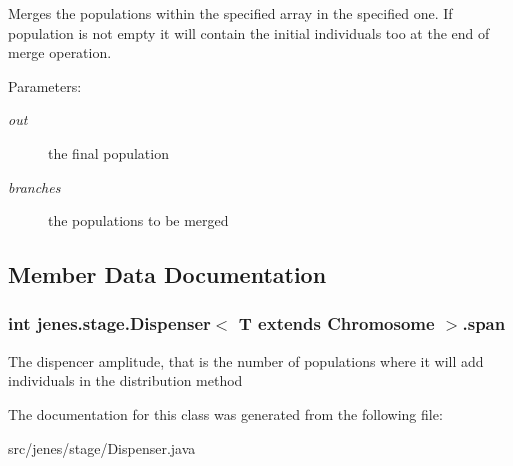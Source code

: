 Merges the populations within the specified array in the specified one. If population is not empty it will contain the initial individuals too at the end of merge operation. 

\begin{Desc}
\item[Parameters:]
\begin{description}
\item[{\em out}]the final population \item[{\em branches}]the populations to be merged \end{description}
\end{Desc}


\subsection{Member Data Documentation}
\hypertarget{classjenes_1_1stage_1_1_dispenser_3_01_t_01extends_01_chromosome_01_4_8f9bc0997e0536729db0c55bc9e240a5}{
\subsubsection[span]{\setlength{\rightskip}{0pt plus 5cm}int jenes.stage.Dispenser$<$ T extends Chromosome $>$.{\bf span}}}
\label{classjenes_1_1stage_1_1_dispenser_3_01_t_01extends_01_chromosome_01_4_8f9bc0997e0536729db0c55bc9e240a5}


The dispencer amplitude, that is the number of populations where it will add individuals in the distribution method 

The documentation for this class was generated from the following file:\begin{CompactItemize}
\item 
src/jenes/stage/Dispenser.java\end{CompactItemize}
